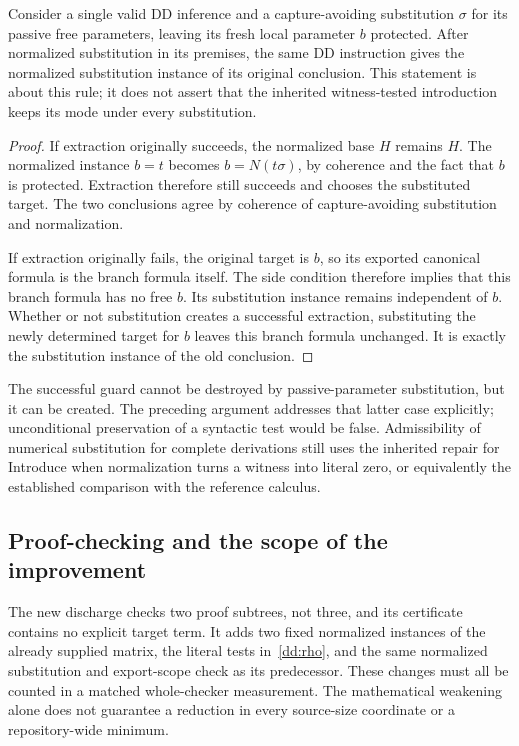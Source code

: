 \begin{proposition}
\label{dd:subst}
Consider a single valid DD inference and a capture-avoiding substitution
$\sigma$ for its passive free parameters, leaving its fresh local parameter
$b$ protected.  After normalized substitution in its premises, the same
DD instruction gives the normalized substitution instance of its original
conclusion.  This statement is about this rule; it does not assert that
the inherited witness-tested introduction keeps its mode under every
substitution.
\end{proposition}
\begin{proof}
If extraction originally succeeds, the normalized base $H$ remains $H$.
The normalized instance $b=t$ becomes $b=N(t\sigma)$, by coherence and
the fact that $b$ is protected.  Extraction therefore still succeeds and
chooses the substituted target.  The two conclusions agree by coherence
of capture-avoiding substitution and normalization.

If extraction originally fails, the original target is $b$, so its
exported canonical formula is the branch formula itself.  The side
condition therefore implies that this branch formula has no free $b$.
Its substitution instance remains independent of $b$.  Whether or not
substitution creates a successful extraction, substituting the newly
determined target for $b$ leaves this branch formula unchanged.  It is
exactly the substitution instance of the old conclusion.
\end{proof}

The successful guard cannot be destroyed by passive-parameter substitution,
but it can be created.  The preceding argument addresses that latter case
explicitly; unconditional preservation of a syntactic test would be false.
Admissibility of numerical substitution for complete derivations still uses
the inherited repair for Introduce when normalization turns a witness into
literal zero, or equivalently the established comparison with the reference
calculus.

\subsection{Proof-checking and the scope of the improvement}

The new discharge checks two proof subtrees, not three, and its certificate
contains no explicit target term.  It adds two fixed normalized instances
of the already supplied matrix, the literal tests in~\eqref{dd:rho}, and
the same normalized substitution and export-scope check as its predecessor.
These changes must all be counted in a matched whole-checker measurement.
The mathematical weakening alone does not guarantee a reduction in every
source-size coordinate or a repository-wide minimum.

